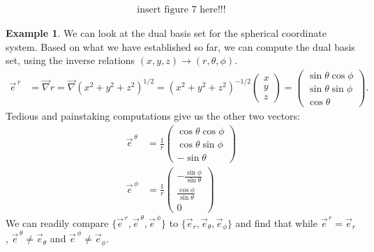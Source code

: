 \documentclass{article}
\theoremstyle{definition}
\newtheorem{exmp}{Example}[section]
\begin{document}
\begin{align*}
\text{insert figure 7 here!!!}
\end{align*}
\begin{exmp}
We can look at the dual basis set for the spherical coordinate system. Based on what we have established so far, we can compute the dual basis set, using the inverse relations $(x,y,z) \rightarrow (r,\theta,\phi)$.
\begin{align*}
\vec{e}^{\,r} &= \vec{\nabla}r = \vec{\nabla}(x^2+y^2+z^2)^{1/2} = (x^2+y^2+z^2)^{-1/2}\begin{pmatrix}x\\y\\z\end{pmatrix} = \begin{pmatrix}\sin\theta\cos\phi\\ \sin\theta\sin\phi\\ \cos\theta\end{pmatrix}.
\end{align*}
Tedious and painstaking computations give us the other two vectors:
\begin{align*}
\vec{e}^{\,\theta} &= \frac{1}{r}\begin{pmatrix} \cos\theta\cos\phi \\ \cos\theta\sin\phi \\ -\sin\theta \end{pmatrix}\\
\vec{e}^{\,\phi} &= \frac{1}{r}\begin{pmatrix} -\frac{\sin\phi}{\sin\theta} \\ \frac{\cos\phi}{\sin\theta} \\ 0\end{pmatrix}
\end{align*}
We can readily compare $\{ \vec{e}^{\,r}, \vec{e}^{\,\theta}, \vec{e}^{\,\phi} \}$ to $\{ \vec{e}_{r}, \vec{e}_\theta, \vec{e}_\phi \}$ and find that while $\vec{e}^{\,r} = \vec{e}_{r}$, $\vec{e}^{\,\theta} \neq \vec{e}_{\theta}$ and $\vec{e}^{\,\phi} \neq \vec{e}_{\phi}$.
\end{exmp}
\end{document}
